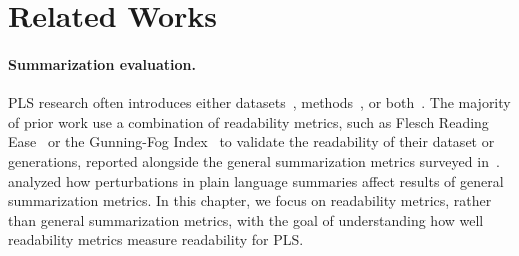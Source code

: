 \section{Related Works}


\paragraph{Summarization evaluation.} PLS research often introduces either datasets~\cite{goldsack2022making,Crossley2021TheCE,pu-etal-2024-scinews,Manor2019PlainES}, methods~\cite{Guo2022RetrievalAO,August2022GeneratingSD,luo2022readability,ji-etal-2024-rag,flores-etal-2023-medical}, or both~\cite{Guo2020AutomatedLL,Zaman2020HTSSAN,chandrasekaran2020overview}. The majority of prior work use a combination of readability metrics, such as Flesch Reading Ease~\cite{Flesch1943MarksOR} or the Gunning-Fog Index~\cite{Gunning1968TheTO} to validate the readability of their dataset or generations, reported alongside the general summarization metrics surveyed in~. \textcite{guo-etal-2024-appls} analyzed how perturbations in plain language summaries affect results of general summarization metrics. In this chapter, we focus on readability metrics, rather than general summarization metrics, with the goal of understanding how well readability metrics measure readability for PLS.

